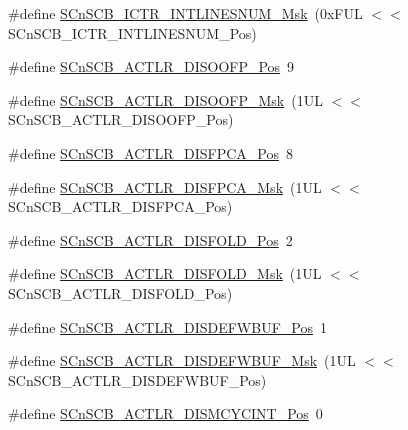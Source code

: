 \begin{DoxyCompactItemize}
\item 
\#define \mbox{\hyperlink{group___c_m_s_i_s___s_cn_s_c_b_ga3efa0f5210051464e1034b19fc7b33c7}{S\+Cn\+S\+C\+B\+\_\+\+I\+C\+T\+R\+\_\+\+I\+N\+T\+L\+I\+N\+E\+S\+N\+U\+M\+\_\+\+Msk}}~(0x\+F\+U\+L $<$$<$ S\+Cn\+S\+C\+B\+\_\+\+I\+C\+T\+R\+\_\+\+I\+N\+T\+L\+I\+N\+E\+S\+N\+U\+M\+\_\+\+Pos)
\item 
\#define \mbox{\hyperlink{group___c_m_s_i_s___s_cn_s_c_b_gaff0b57464c60fea8182b903676f8de49}{S\+Cn\+S\+C\+B\+\_\+\+A\+C\+T\+L\+R\+\_\+\+D\+I\+S\+O\+O\+F\+P\+\_\+\+Pos}}~9
\item 
\#define \mbox{\hyperlink{group___c_m_s_i_s___s_cn_s_c_b_ga1ecd6adafa43464d7097b132c19e8640}{S\+Cn\+S\+C\+B\+\_\+\+A\+C\+T\+L\+R\+\_\+\+D\+I\+S\+O\+O\+F\+P\+\_\+\+Msk}}~(1\+U\+L $<$$<$ S\+Cn\+S\+C\+B\+\_\+\+A\+C\+T\+L\+R\+\_\+\+D\+I\+S\+O\+O\+F\+P\+\_\+\+Pos)
\item 
\#define \mbox{\hyperlink{group___c_m_s_i_s___s_cn_s_c_b_gaa194809383bc72ecf3416d85709281d7}{S\+Cn\+S\+C\+B\+\_\+\+A\+C\+T\+L\+R\+\_\+\+D\+I\+S\+F\+P\+C\+A\+\_\+\+Pos}}~8
\item 
\#define \mbox{\hyperlink{group___c_m_s_i_s___s_cn_s_c_b_ga10d5aa4a196dcde6f476016ece2c1b69}{S\+Cn\+S\+C\+B\+\_\+\+A\+C\+T\+L\+R\+\_\+\+D\+I\+S\+F\+P\+C\+A\+\_\+\+Msk}}~(1\+U\+L $<$$<$ S\+Cn\+S\+C\+B\+\_\+\+A\+C\+T\+L\+R\+\_\+\+D\+I\+S\+F\+P\+C\+A\+\_\+\+Pos)
\item 
\#define \mbox{\hyperlink{group___c_m_s_i_s___s_cn_s_c_b_gaab395870643a0bee78906bb15ca5bd02}{S\+Cn\+S\+C\+B\+\_\+\+A\+C\+T\+L\+R\+\_\+\+D\+I\+S\+F\+O\+L\+D\+\_\+\+Pos}}~2
\item 
\#define \mbox{\hyperlink{group___c_m_s_i_s___s_cn_s_c_b_gaa9dd2d4a2350499188f438d0aa9fd982}{S\+Cn\+S\+C\+B\+\_\+\+A\+C\+T\+L\+R\+\_\+\+D\+I\+S\+F\+O\+L\+D\+\_\+\+Msk}}~(1\+U\+L $<$$<$ S\+Cn\+S\+C\+B\+\_\+\+A\+C\+T\+L\+R\+\_\+\+D\+I\+S\+F\+O\+L\+D\+\_\+\+Pos)
\item 
\#define \mbox{\hyperlink{group___c_m_s_i_s___s_cn_s_c_b_gafa2eb37493c0f8dae77cde81ecf80f77}{S\+Cn\+S\+C\+B\+\_\+\+A\+C\+T\+L\+R\+\_\+\+D\+I\+S\+D\+E\+F\+W\+B\+U\+F\+\_\+\+Pos}}~1
\item 
\#define \mbox{\hyperlink{group___c_m_s_i_s___s_cn_s_c_b_ga6cda7b7219232a008ec52cc8e89d5d08}{S\+Cn\+S\+C\+B\+\_\+\+A\+C\+T\+L\+R\+\_\+\+D\+I\+S\+D\+E\+F\+W\+B\+U\+F\+\_\+\+Msk}}~(1\+U\+L $<$$<$ S\+Cn\+S\+C\+B\+\_\+\+A\+C\+T\+L\+R\+\_\+\+D\+I\+S\+D\+E\+F\+W\+B\+U\+F\+\_\+\+Pos)
\item 
\#define \mbox{\hyperlink{group___c_m_s_i_s___s_cn_s_c_b_gaaa3e79f5ead4a32c0ea742b2a9ffc0cd}{S\+Cn\+S\+C\+B\+\_\+\+A\+C\+T\+L\+R\+\_\+\+D\+I\+S\+M\+C\+Y\+C\+I\+N\+T\+\_\+\+Pos}}~0
$$
\end{DoxyCompactItemize}

